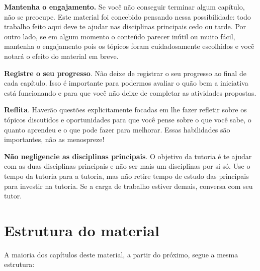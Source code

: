 \textbf{Mantenha o engajamento.} Se você não conseguir terminar algum capítulo, não se preocupe. Este material foi concebido pensando nessa possibilidade: todo trabalho feito aqui deve te ajudar nas disciplinas principais cedo ou tarde. Por outro lado, se em algum momento o conteúdo parecer inútil ou muito fácil, mantenha o engajamento pois os tópicos foram cuidadosamente escolhidos e vocẽ notará o efeito do material em breve.

\textbf{Registre o seu progresso}. Não deixe de registrar o seu progresso ao final de cada capítulo. Isso é importante para podermos avaliar o quão bem a iniciativa está funcionando e para que você não deixe de completar as atividades propostas.

\textbf{Reflita}. Haverão questões explicitamente focadas em lhe fazer refletir sobre os tópicos discutidos e oportunidades para que você pense sobre o que você sabe, o quanto aprendeu e o que pode fazer para melhorar. Essas habilidades são importantes, não as menospreze! 

\textbf{Não negligencie as disciplinas principais}. O objetivo da tutoria é te ajudar com as duas disciplinas principais e não ser mais um disciplinas por si só. Use o tempo da tutoria para a tutoria, mas não retire tempo de estudo das principais para investir na tutoria. Se a carga de trabalho estiver demais, conversa com seu tutor.

\section{Estrutura do material}

A maioria dos capítulos deste material, a partir do próximo, segue a mesma estrutura:

